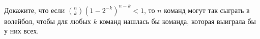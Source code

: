 Докажите, что если $\binom{n}{k} (1 - 2^{-k})^{n - k} < 1$, то $n$ команд могут так сыграть в волейбол, чтобы для любых $k$
команд нашлась бы команда, которая выиграла бы у них всех.